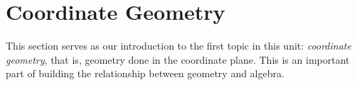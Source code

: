\section{Coordinate Geometry} 
This section serves as our introduction to the first topic in this unit: \emph{coordinate geometry}, that is, geometry done in the coordinate plane. This is an important part of building the relationship between geometry and algebra.

 







